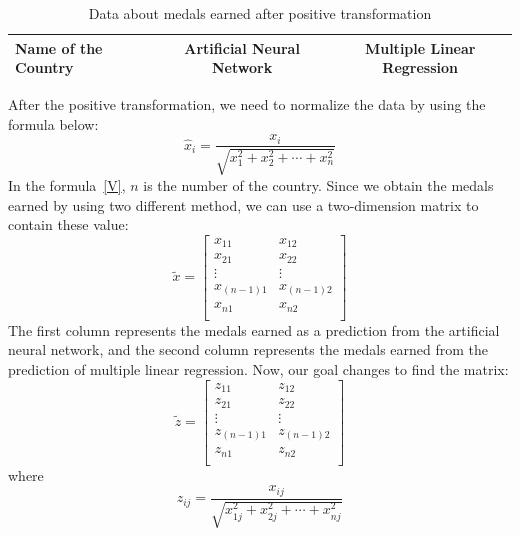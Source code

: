 \documentclass{mcmthesis}
\begin{document}
\begin{table}[H]
\centering 
\label{A}
\caption{Data about medals earned after positive transformation}
\vspace{5pt}
\begin{tabular}{lcc}
\hline
\textbf{Name of the Country} & \textbf{Artificial Neural Network} & \textbf{Multiple Linear Regression} \\
\hline\hline
\end{tabular}
\end{table}
After the positive transformation, we need to normalize the data by using the formula below:\\
\begin{equation}\label{V}
\hat{x}_i=\frac{x_i}{\sqrt{x_{1}^{2}+x_{2}^{2}+\cdots+x_{n}^{2}}}
\end{equation}
In the formula~\eqref{V}, $n$ is the number of the country. Since we obtain the medals earned by using two different method, we can use a two-dimension matrix to contain these value:\\
\begin{equation}\label{eq:3}
\tilde{x}=
\begin{bmatrix}
	x_{11}&		x_{12}\\
	x_{21}&		x_{22}\\
	\vdots&		\vdots\\
	x_{(n-1)1}&		x_{(n-1)2}\\
	x_{n1}&		x_{n2}\\
\end{bmatrix}
\end{equation}
The first column represents the medals earned as a prediction from the artificial neural network, and the second column represents the medals earned from the prediction of multiple linear regression.
Now, our goal changes to find the matrix:
\begin{equation}\label{eq:3}
\tilde{z}=
\begin{bmatrix}
	z_{11}&		z_{12}\\
	z_{21}&		z_{22}\\
	\vdots&		\vdots\\
	z_{\left( n-1 \right) 1}&		z_{\left( n-1 \right) 2}\\
	z_{n1}&		z_{n2}\\
\end{bmatrix}
\end{equation}
where
\begin{equation}\label{eq:1}
z_{ij}=\frac{x_{ij}}{\sqrt{x_{1j}^{2}+x_{2j}^{2}+\cdots+x_{nj}^{2}}}
\end{equation}
\end{document}
